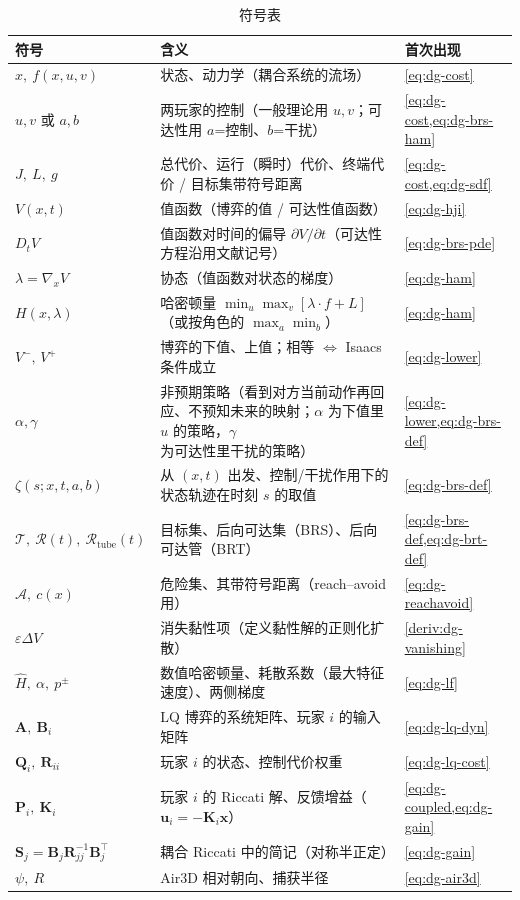 \begin{table}[H]\centering\small
\caption{符号表}
\label{tab:dg-symbols}
\begin{tabularx}{\linewidth}{lLl}
\toprule
符号 & 含义 & 首次出现 \\
\midrule
$x,\ f(x,u,v)$ & 状态、动力学（耦合系统的流场） & \cref{eq:dg-cost} \\
$u,v$ 或 $a,b$ & 两玩家的控制（一般理论用 $u,v$；可达性用 $a$=控制、$b$=干扰） & \cref{eq:dg-cost,eq:dg-brs-ham} \\
$J,\ L,\ g$ & 总代价、运行（瞬时）代价、终端代价 / 目标集带符号距离 & \cref{eq:dg-cost,eq:dg-sdf} \\
$V(x,t)$ & 值函数（博弈的值 / 可达性值函数） & \cref{eq:dg-hji} \\
$D_t V$ & 值函数对时间的偏导 $\partial V/\partial t$（可达性方程沿用文献记号） & \cref{eq:dg-brs-pde} \\
$\lambda=\nabla_x V$ & 协态（值函数对状态的梯度） & \cref{eq:dg-ham} \\
$H(x,\lambda)$ & 哈密顿量 $\min_u\max_v[\lambda\cdot f+L]$（或按角色的 $\max_a\min_b$） & \cref{eq:dg-ham} \\
$V^-,\,V^+$ & 博弈的下值、上值；相等 $\iff$ Isaacs 条件成立 & \cref{eq:dg-lower} \\
$\alpha,\gamma$ & 非预期策略（看到对方当前动作再回应、不预知未来的映射；$\alpha$ 为下值里 $u$ 的策略，$\gamma$ 为可达性里干扰的策略） & \cref{eq:dg-lower,eq:dg-brs-def} \\
$\zeta(s;x,t,a,b)$ & 从 $(x,t)$ 出发、控制/干扰作用下的状态轨迹在时刻 $s$ 的取值 & \cref{eq:dg-brs-def} \\
$\mathcal{T},\ \mathcal{R}(t),\ \mathcal{R}_{\text{tube}}(t)$ & 目标集、后向可达集（BRS）、后向可达管（BRT） & \cref{eq:dg-brs-def,eq:dg-brt-def} \\
$\mathcal{A},\ c(x)$ & 危险集、其带符号距离（reach--avoid 用） & \cref{eq:dg-reachavoid} \\
$\varepsilon\Delta V$ & 消失黏性项（定义黏性解的正则化扩散） & \cref{deriv:dg-vanishing} \\
$\hat H,\ \alpha,\ p^\pm$ & 数值哈密顿量、耗散系数（最大特征速度）、两侧梯度 & \cref{eq:dg-lf} \\
$\mathbf A,\ \mathbf B_i$ & LQ 博弈的系统矩阵、玩家 $i$ 的输入矩阵 & \cref{eq:dg-lq-dyn} \\
$\mathbf Q_i,\ \mathbf R_{ii}$ & 玩家 $i$ 的状态、控制代价权重 & \cref{eq:dg-lq-cost} \\
$\mathbf P_i,\ \mathbf K_i$ & 玩家 $i$ 的 Riccati 解、反馈增益（$\mathbf u_i=-\mathbf K_i\mathbf x$） & \cref{eq:dg-coupled,eq:dg-gain} \\
$\mathbf S_j=\mathbf B_j\mathbf R_{jj}^{-1}\mathbf B_j^\top$ & 耦合 Riccati 中的简记（对称半正定） & \cref{eq:dg-gain} \\
$\psi,\ R$ & Air3D 相对朝向、捕获半径 & \cref{eq:dg-air3d} \\
\bottomrule
\end{tabularx}
\end{table}

